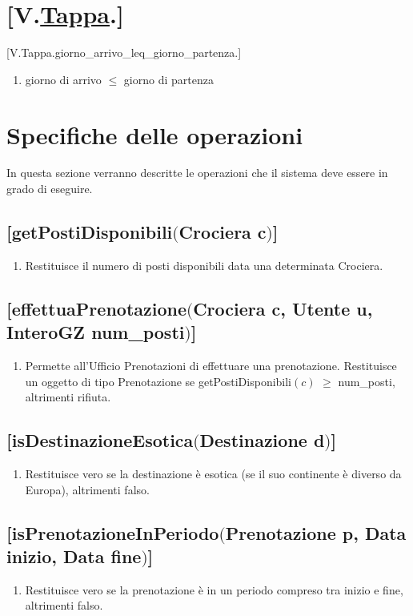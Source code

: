 \documentclass{article}
\begin{document}
\section*{[V.\hyperref[sec:Tappa]{Tappa}.]}
    [V.Tappa.giorno\_arrivo\_leq\_giorno\_partenza.]
    \begin{enumerate}
        \item giorno di arrivo $\leq$ giorno di partenza
    \end{enumerate}

\newpage
\section{Specifiche delle operazioni}

In questa sezione verranno descritte le operazioni che il sistema deve essere in grado di eseguire.
\subsection*{[getPostiDisponibili$($Crociera c$)$]}
\begin{enumerate}
    \item Restituisce il numero di posti disponibili data una determinata Crociera.
\end{enumerate}

\subsection*{[effettuaPrenotazione$($Crociera c, Utente u, InteroGZ num\_posti$)$]}
\begin{enumerate}
    \item Permette all'Ufficio Prenotazioni di effettuare una prenotazione. Restituisce un oggetto di tipo Prenotazione se getPostiDisponibili$(c)$ $\geq$ num\_posti, altrimenti rifiuta.
\end{enumerate}

\subsection*{[isDestinazioneEsotica$($Destinazione d$)$]}
\begin{enumerate}
    \item Restituisce vero se la destinazione è esotica (se il suo continente è diverso da Europa), altrimenti falso.
\end{enumerate}

\subsection*{[isPrenotazioneInPeriodo$($Prenotazione p, Data inizio, Data fine$)$]}
\begin{enumerate}
    \item Restituisce vero se la prenotazione è in un periodo compreso tra inizio e fine, altrimenti falso.
\end{enumerate}
\end{document}

